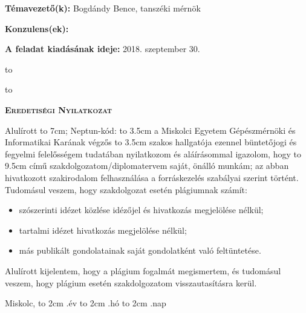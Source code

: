 \vfill


\noindent\textbf{Témavezető(k):} Bogdándy Bence, tanszéki mérnök

\noindent\textbf{Konzulens(ek):} 

\noindent\textbf{A feladat kiadásának ideje:} 2018. szeptember 30.


\vskip 2cm

\hbox to 

\hbox to 

\newpage

\vspace*{1cm}  
\begin{center}
	\large\textsc{\bfseries Eredetiségi Nyilatkozat}
\end{center}
\vspace*{2cm}  

Alulírott \hbox to 7cm{\dotfill}; Neptun-kód: \hbox to 3.5cm{\dotfill} a Miskolci Egyetem Gépészmérnöki és Informatikai Karának végzős \hbox to 3.5cm{\dotfill} szakos hallgatója ezennel büntetőjogi és fegyelmi felelősségem tudatában nyilatkozom és aláírásommal igazolom, hogy \hbox to 9.5cm{\dotfill}
című szakdolgozatom/diplomatervem saját, önálló munkám; az abban hivatkozott szakirodalom
felhasználása a forráskezelés szabályai szerint történt.\\

Tudomásul veszem, hogy szakdolgozat esetén plágiumnak számít:
\begin{itemize}
	\item szószerinti idézet közlése idézőjel és hivatkozás megjelölése nélkül;
	\item tartalmi idézet hivatkozás megjelölése nélkül;
	\item más publikált gondolatainak saját gondolatként való feltüntetése.
\end{itemize}

Alulírott kijelentem, hogy a plágium fogalmát megismertem, és tudomásul veszem, hogy
plágium esetén szakdolgozatom visszautasításra kerül.

\vspace*{3cm}

\noindent Miskolc, \hbox to 2cm{\dotfill} .év \hbox to 2cm{\dotfill} .hó \hbox to 2cm{\dotfill} .nap

\vspace*{3cm}

